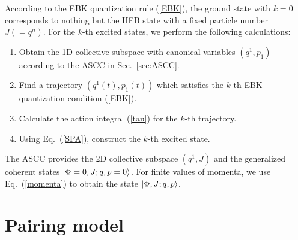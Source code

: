 \documentclass[%
superscriptaddress,
showpacs,
nofootinbib,
amsmath,amssymb,
aps,
prc,
twocolumn,
floatfix ]%
{revtex4-1}
\begin{document}
According to the EBK quantization rule (\ref{EBK}),
the ground state with $k=0$ corresponds to nothing but the HFB state
with a fixed particle number $J(=q^n)$.
For the $k$-th excited states, we perform the following calculations:
\begin{enumerate}
\item Obtain the 1D collective subspace with canonical variables $(q^1,p_1)$
	according to the ASCC in Sec.~\ref{sec:ASCC}.
\item Find a trajectory $(q^1(t),p_1(t))$ which satisfies
the $k$-th EBK quantization condition (\ref{EBK}).
\item Calculate the action integral (\ref{tau}) for the $k$-th trajectory.
\item Using Eq.~(\ref{SPA}), construct the $k$-th excited state.
\end{enumerate}
The ASCC provides the 2D collective subspace $(q^1,J)$
and the generalized coherent states $\ket{\Phi=0,J;q,p=0}$.
For finite values of momenta, we use Eq.~(\ref{momenta})
to obtain the state $\ket{\Phi,J;q,p}$.


\section{Pairing model}
\label{sec3}
\end{document}
